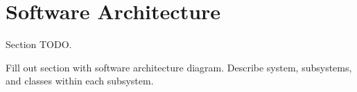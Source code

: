 \documentclass[12pt]{article} %
\begin{document}
\section{Software Architecture} %

Section TODO.

Fill out section with software architecture diagram. Describe system, subsystems, and
classes within each subsystem.












 

\end{document}
